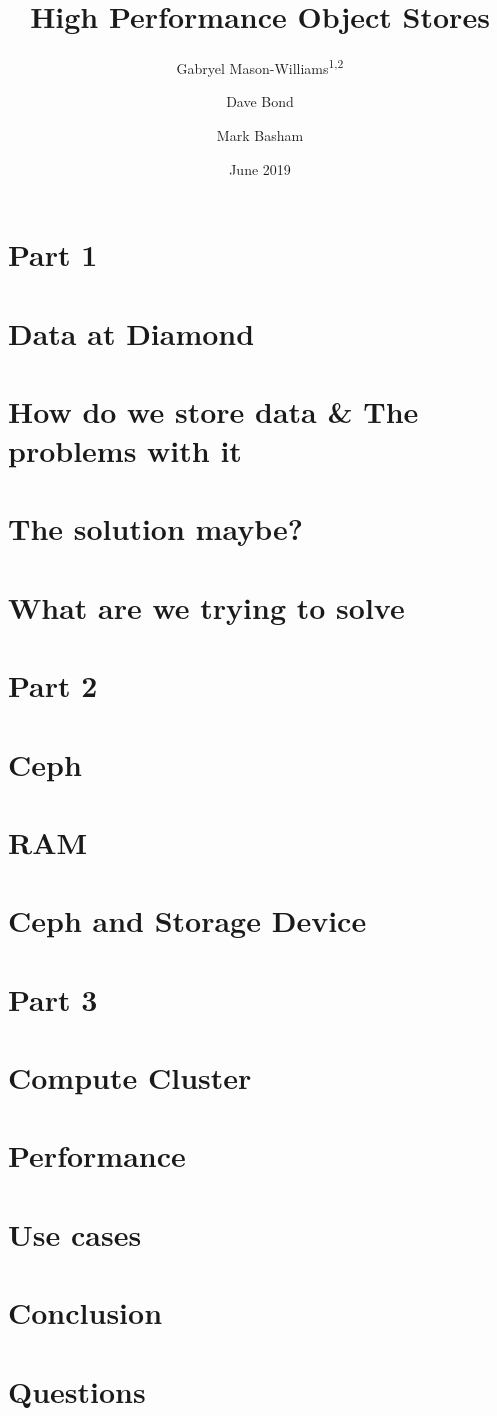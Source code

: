 \documentclass[notes,11pt]{beamer}
\title[Big Data]{High Performance Object Stores}
\date{June 2019}
\author[]{Gabryel Mason-Williams\textsuperscript{1,2} \and Dave Bond \inst{1} \and Mark Basham \inst{1,3}}
\begin{document}

\section{Part 1}
\section{Data at Diamond}

\section{How do we store data \& The problems with it}

\section{The solution maybe?}

\section{What are we trying to solve}
\section{Part 2}

\section{Ceph}

\section{RAM}

\section{Ceph and Storage Device}

\section{Part 3}

\section{Compute Cluster}

\section{Performance}

\section{Use cases}

\section{Conclusion}

\section{Questions}

\end{document}
